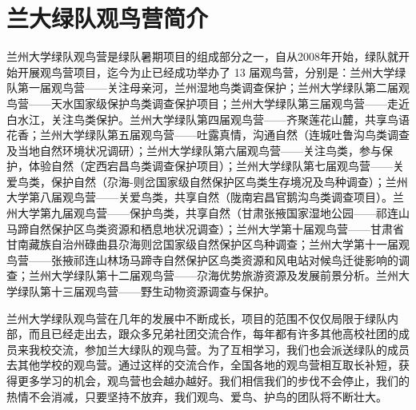 \documentclass[UTF8,a4paper，12pt]{ctexart}
\begin{document}
\section*{兰大绿队观鸟营简介}
兰州大学绿队观鸟营是绿队暑期项目的组成部分之一，自从2008年开始，绿队就开始开展观鸟营项目，迄今为止已经成功举办了 13 届观鸟营，分别是：兰州大学绿队第一届观鸟营——关注母亲河，兰州湿地鸟类调查保护；兰州大学绿队第二届观鸟营——天水国家级保护鸟类调查保护项目；兰州大学绿队第三届观鸟营——走近白水江，关注鸟类保护。兰州大学绿队第四届观鸟营——齐聚莲花山麓，共享鸟语花香；兰州大学绿队第五届观鸟营——吐露真情，沟通自然（连城吐鲁沟鸟类调查及当地自然环境状况调研）；兰州大学绿队第六届观鸟营——关注鸟类，参与保护，体验自然（定西宕昌鸟类调查保护项目）；兰州大学绿队第七届观鸟营——关爱鸟类，保护自然（尕海-则岔国家级自然保护区鸟类生存境况及鸟种调查）；兰州大学第八届观鸟营——关爱鸟类，共享自然（陇南宕昌官鹅沟鸟类调查项目）。兰州大学第九届观鸟营——保护鸟类，共享自然（甘肃张掖国家湿地公园——祁连山马蹄自然保护区鸟类资源和栖息地状况调查）；兰州大学第十届观鸟营——甘肃省甘南藏族自治州碌曲县尕海则岔国家级自然保护区鸟种调查；兰州大学第十一届观鸟营——张掖祁连山林场马蹄寺自然保护区鸟类资源和风电站对候鸟迁徙影响的调查；兰州大学绿队第十二届观鸟营——尕海优势旅游资源及发展前景分析。兰州大学绿队第十三届观鸟营——野生动物资源调查与保护。\\
\par 兰州大学绿队观鸟营在几年的发展中不断成长，项目的范围不仅仅局限于绿队内部，而且已经走出去，跟众多兄弟社团交流合作，每年都有许多其他高校社团的成员来我校交流，参加兰大绿队的观鸟营。为了互相学习，我们也会派送绿队的成员去其他学校的观鸟营。通过这样的交流合作，全国各地的观鸟营相互取长补短，获得更多学习的机会，观鸟营也会越办越好。我们相信我们的步伐不会停止，我们的热情不会消减，只要坚持不放弃，我们观鸟、爱鸟、护鸟的团队将不断壮大。
\end{document}
